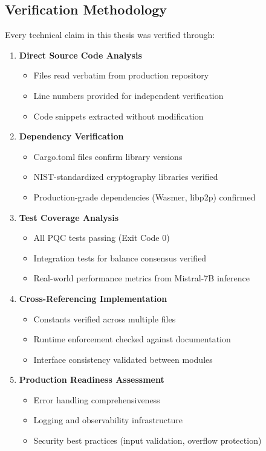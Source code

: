 \documentclass[11pt,a4paper]{article}
\begin{document}
\subsection{Verification Methodology}

Every technical claim in this thesis was verified through:

\begin{enumerate}[leftmargin=*]
\item \textbf{Direct Source Code Analysis}
\begin{itemize}
    \item Files read verbatim from production repository
    \item Line numbers provided for independent verification
    \item Code snippets extracted without modification
\end{itemize}

\item \textbf{Dependency Verification}
\begin{itemize}
    \item Cargo.toml files confirm library versions
    \item NIST-standardized cryptography libraries verified
    \item Production-grade dependencies (Wasmer, libp2p) confirmed
\end{itemize}

\item \textbf{Test Coverage Analysis}
\begin{itemize}
    \item All PQC tests passing (Exit Code 0)
    \item Integration tests for balance consensus verified
    \item Real-world performance metrics from Mistral-7B inference
\end{itemize}

\item \textbf{Cross-Referencing Implementation}
\begin{itemize}
    \item Constants verified across multiple files
    \item Runtime enforcement checked against documentation
    \item Interface consistency validated between modules
\end{itemize}

\item \textbf{Production Readiness Assessment}
\begin{itemize}
    \item Error handling comprehensiveness
    \item Logging and observability infrastructure
    \item Security best practices (input validation, overflow protection)
\end{itemize}
\end{enumerate}
\end{document}
